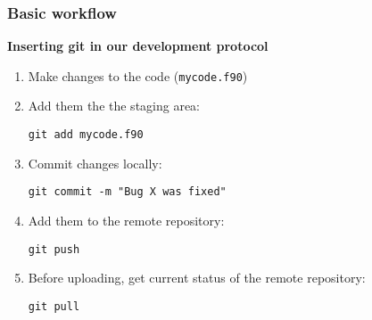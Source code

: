 \documentclass[xcolor=dvipsnames,10pt]{beamer}
\begin{document}
\begin{frame}
 \frametitle{Basic workflow}
 
 \textbf{Inserting git in our development protocol} 
 \vspace*{0.5cm}
 
 \begin{enumerate}
  \item Make changes to the code  (\texttt{mycode.f90})
  \vspace*{0.2cm}
  
  \item Add them the the staging area: 
  
  \texttt{git add mycode.f90}
  \vspace*{0.2cm}
  
  \item Commit changes locally:
  
  \texttt{git commit -m "Bug X was fixed"}
  \vspace*{0.2cm}
  
  \pause
  
  \item Add them to the remote repository:
  
  \texttt{git push}
     \vspace*{0.2cm}
  
  \color{white}
  \item[] Before uploading, get current status of the remote repository:
  
  \texttt{git pull}
 \end{enumerate}

\end{frame}
\addtocounter{framenumber}{-1}
\end{document}
